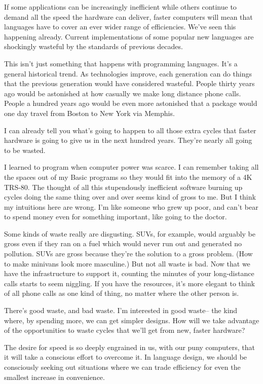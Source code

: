 If some applications can be increasingly inefficient while others
continue to demand all the speed the hardware can deliver, faster
computers will mean that languages have to cover an ever wider range of
efficiencies. We've seen this happening already. Current implementations
of some popular new languages are shockingly wasteful by the standards
of previous decades.

This isn't just something that happens with programming languages. It's
a general historical trend. As technologies improve, each generation can
do things that the previous generation would have considered wasteful.
People thirty years ago would be astonished at how casually we make long
distance phone calls. People a hundred years ago would be even more
astonished that a package would one day travel from Boston to New York
via Memphis.

I can already tell you what's going to happen to all those extra cycles
that faster hardware is going to give us in the next hundred years.
They're nearly all going to be wasted.

I learned to program when computer power was scarce. I can remember
taking all the spaces out of my Basic programs so they would fit into
the memory of a 4K TRS-80. The thought of all this stupendously
inefficient software burning up cycles doing the same thing over and
over seems kind of gross to me. But I think my intuitions here are
wrong. I'm like someone who grew up poor, and can't bear to spend money
even for something important, like going to the doctor.

Some kinds of waste really are disgusting. SUVs, for example, would
arguably be gross even if they ran on a fuel which would never run out
and generated no pollution. SUVs are gross because they're the solution
to a gross problem. (How to make minivans look more masculine.) But not
all waste is bad. Now that we have the infrastructure to support it,
counting the minutes of your long-distance calls starts to seem
niggling. If you have the resources, it's more elegant to think of all
phone calls as one kind of thing, no matter where the other person is.

There's good waste, and bad waste. I'm interested in good waste-- the
kind where, by spending more, we can get simpler designs. How will we
take advantage of the opportunities to waste cycles that we'll get from
new, faster hardware?

The desire for speed is so deeply engrained in us, with our puny
computers, that it will take a conscious effort to overcome it. In
language design, we should be consciously seeking out situations where
we can trade efficiency for even the smallest increase in convenience.

